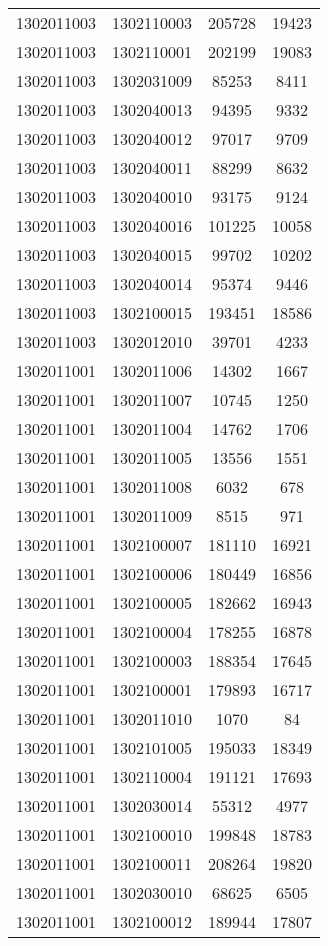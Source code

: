 \begin{longtable}{llcc}
1302011003 & 1302110003 & 205728 & 19423\\
1302011003 & 1302110001 & 202199 & 19083\\
1302011003 & 1302031009 & 85253 & 8411\\
1302011003 & 1302040013 & 94395 & 9332\\
1302011003 & 1302040012 & 97017 & 9709\\
1302011003 & 1302040011 & 88299 & 8632\\
1302011003 & 1302040010 & 93175 & 9124\\
1302011003 & 1302040016 & 101225 & 10058\\
1302011003 & 1302040015 & 99702 & 10202\\
1302011003 & 1302040014 & 95374 & 9446\\
1302011003 & 1302100015 & 193451 & 18586\\
1302011003 & 1302012010 & 39701 & 4233\\
1302011001 & 1302011006 & 14302 & 1667\\
1302011001 & 1302011007 & 10745 & 1250\\
1302011001 & 1302011004 & 14762 & 1706\\
1302011001 & 1302011005 & 13556 & 1551\\
1302011001 & 1302011008 & 6032 & 678\\
1302011001 & 1302011009 & 8515 & 971\\
1302011001 & 1302100007 & 181110 & 16921\\
1302011001 & 1302100006 & 180449 & 16856\\
1302011001 & 1302100005 & 182662 & 16943\\
1302011001 & 1302100004 & 178255 & 16878\\
1302011001 & 1302100003 & 188354 & 17645\\
1302011001 & 1302100001 & 179893 & 16717\\
1302011001 & 1302011010 & 1070 & 84\\
1302011001 & 1302101005 & 195033 & 18349\\
1302011001 & 1302110004 & 191121 & 17693\\
1302011001 & 1302030014 & 55312 & 4977\\
1302011001 & 1302100010 & 199848 & 18783\\
1302011001 & 1302100011 & 208264 & 19820\\
1302011001 & 1302030010 & 68625 & 6505\\
1302011001 & 1302100012 & 189944 & 17807\\

\end{longtable}
